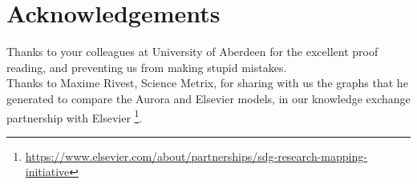 \documentclass{article}
\begin{document}
\section{Acknowledgements}
Thanks to your colleagues at University of Aberdeen for the excellent proof reading, and preventing us from making stupid mistakes.\\
Thanks to Maxime Rivest, Science Metrix, for sharing with us the graphs that he generated to compare the Aurora and Elsevier models, in our knowledge exchange partnership with Elsevier \footnote{ \url{https://www.elsevier.com/about/partnerships/sdg-research-mapping-initiative}}. 

  


\doclicenseThis
\end{document}

